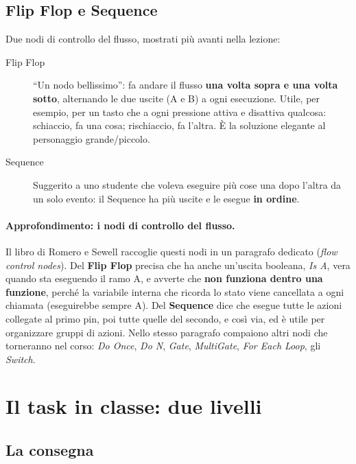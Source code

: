 \subsection{Flip Flop e Sequence}

Due nodi di controllo del flusso, mostrati più avanti nella lezione:
\begin{description}
  \item[Flip Flop] ``Un nodo bellissimo'': fa andare il flusso \textbf{una
        volta sopra e una volta sotto}, alternando le due uscite (A e B) a ogni
        esecuzione. Utile, per esempio, per un tasto che a ogni pressione
        attiva e disattiva qualcosa: schiaccio, fa una cosa; rischiaccio, fa
        l'altra. È la soluzione elegante al personaggio grande/piccolo.
  \item[Sequence] Suggerito a uno studente che voleva eseguire più cose una
        dopo l'altra da un solo evento: il Sequence ha più uscite e le
        esegue \textbf{in ordine}.
\end{description}

\paragraph{Approfondimento: i nodi di controllo del flusso.} Il libro di
Romero e Sewell raccoglie questi nodi in un paragrafo dedicato
(\emph{flow control nodes}). Del \textbf{Flip Flop} precisa che ha anche
un'uscita booleana, \emph{Is A}, vera quando sta eseguendo il ramo A, e
avverte che \textbf{non funziona dentro una funzione}, perché la variabile
interna che ricorda lo stato viene cancellata a ogni chiamata (eseguirebbe
sempre A). Del \textbf{Sequence} dice che esegue tutte le azioni collegate al
primo pin, poi tutte quelle del secondo, e così via, ed è utile per
organizzare gruppi di azioni. Nello stesso paragrafo compaiono altri nodi che
torneranno nel corso: \emph{Do Once}, \emph{Do N}, \emph{Gate},
\emph{MultiGate}, \emph{For Each Loop}, gli \emph{Switch}.

\section{Il task in classe: due livelli}
\label{gd7:sec:task}

\subsection{La consegna}

